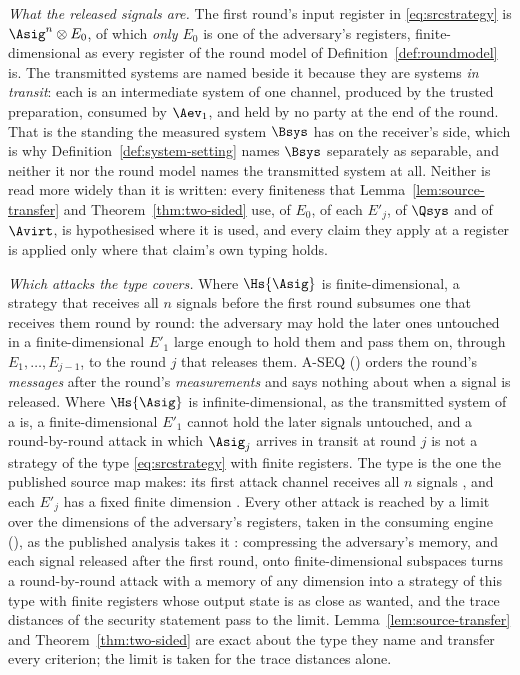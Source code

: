 \begin{remark}\label{rem:source-transfer-registers}
\emph{What the released signals are.} The first round's input register in
\eqref{eq:srcstrategy} is $\Asig^{n}\otimes E_0$, of which \emph{only $E_0$}
is one of the adversary's registers, finite-dimensional as every register of
the round model of Definition~\ref{def:roundmodel} is. The
transmitted systems are named beside it because they are systems \emph{in
transit}: each is an intermediate system of one channel, produced by the
trusted preparation, consumed by $\Aev_1$, and held by no party at the end of
the round. That is the standing the measured system $\Bsys$ has on the
receiver's side, which is why Definition~\ref{def:system-setting} names
$\Bsys$ separately as separable, and neither it nor the round model names the
transmitted system at all. Neither is read more widely than it is written:
every finiteness that
Lemma~\ref{lem:source-transfer} and Theorem~\ref{thm:two-sided} use, of
$E_0$, of each $E'_j$, of $\Qsys$ and of $\Avirt$, is hypothesised where it is
used, and every claim they apply at a register is applied only where that
claim's own typing holds.

\emph{Which attacks the type covers.} Where $\Hs{\Asig}$ is
finite-dimensional, a strategy that receives all $n$ signals before the first
round subsumes one that receives them round by round: the adversary may hold
the later ones untouched in a finite-dimensional $E'_1$ large enough to hold
them and pass them on, through $E_1,\dots,E_{j-1}$, to the round $j$ that
releases them. A-SEQ
() orders the round's \emph{messages} after the
round's \emph{measurements} and says nothing about when a signal is released.
Where $\Hs{\Asig}$ is infinite-dimensional, as the transmitted system of a
 is, a finite-dimensional $E'_1$ cannot hold the later
signals untouched, and a round-by-round attack in which $\Asig_j$ arrives in
transit at round $j$ is not a strategy of the type \eqref{eq:srcstrategy}
with finite registers. The type is the one the published source map makes:
its first attack channel receives all $n$ signals
\cite[Lemma~9.1, Eq.~(140)]{tupkary2026decoy}, and each $E'_j$ has a fixed
finite dimension \cite[Rem.~8.4]{tupkary2026decoy}. Every other attack is
reached by a limit over the dimensions of the adversary's registers, taken
in the consuming engine (), as the published
analysis takes it \cite[Thm.~A.1, Rem.~A.2]{tupkary2026decoy}: compressing
the adversary's memory, and each signal released after the first round, onto
finite-dimensional subspaces turns a round-by-round attack with a memory of
any dimension into a strategy of this type with finite registers whose output
state is as close as wanted, and the trace distances of the security
statement pass to the limit. Lemma~\ref{lem:source-transfer} and
Theorem~\ref{thm:two-sided} are exact about the type they name and transfer
every criterion; the limit is taken for the trace distances alone.


\end{remark}
